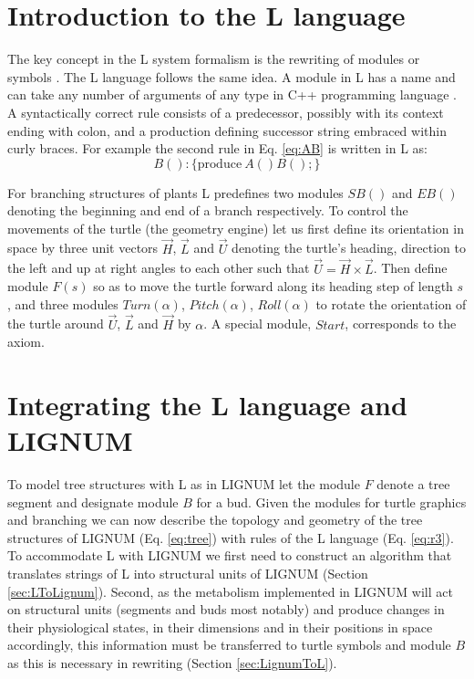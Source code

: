 \section{Introduction to the L language}

The key concept in the L  system formalism is the rewriting of modules
or symbols  \citep{pp:89}.  The  L language follows  the same  idea. A
module in  L has a name  and can take  any number of arguments  of any
type   in   C++   programming   language   \citep{stroustrup:97}.    A
syntactically correct  rule consists  of a predecessor,  possibly with
its  context ending with  colon, and  a production  defining successor
string embraced within  curly braces.  For example the  second rule in
Eq.   \ref{eq:AB} is  written in  L  as: \begin{equation}\label{eq:r3}
B(): \{\mathrm{produce}\ A()B();\} \end{equation}

For branching structures of plants L predefines two modules $SB()$ and
$EB()$ denoting  the beginning and  end of a branch  respectively.  To
control the movements of the turtle (the geometry engine) let us first
define its orientation in space  by three unit vectors $\vec H$, $\vec
L$ and $\vec  U$ denoting the turtle's heading,  direction to the left
and up at right angles to each other such that $\vec U = \vec H \times
\vec L$.  Then  define module $F(s)$ so as to  move the turtle forward
along   its  heading   step   of  length   $s$,   and  three   modules
$Turn(\alpha)$,   $Pitch(\alpha)$,   $Roll(\alpha)$   to  rotate   the
orientation of  the turtle around $\vec  U$, $\vec L$ and  $\vec H$ by
$\alpha$.  A special module, $Start$, corresponds to the axiom.


\section{Integrating the L language and LIGNUM}\label{sec:pine}

To model tree structures with L as in LIGNUM let the module $F$ denote
a tree segment and designate module  $B$ for a bud.  Given the modules
for turtle graphics and branching we can now describe the topology and
geometry of  the tree structures  of LIGNUM (Eq.   \ref{eq:tree}) with
rules of  the L  language (Eq.  \ref{eq:r3}).   To accommodate  L with
LIGNUM we first need to construct an algorithm that translates strings
of L  into structural  units of LIGNUM  (Section \ref{sec:LToLignum}).
Second, as the metabolism implemented in LIGNUM will act on structural
units (segments  and buds most  notably) and produce changes  in their
physiological states,  in their dimensions  and in their  positions in
space  accordingly, this  information  must be  transferred to  turtle
symbols  and module  $B$ as  this is  necessary in  rewriting (Section
\ref{sec:LignumToL}).

